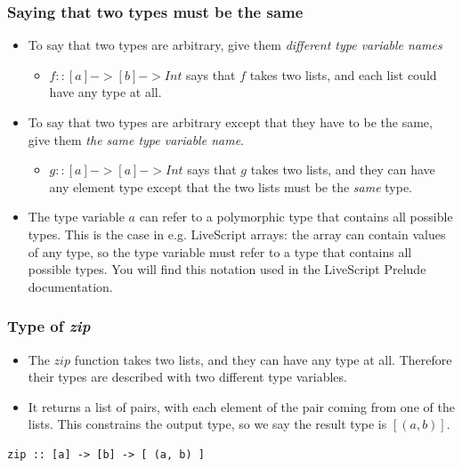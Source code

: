 \documentclass{beamer}
\begin{document}
\begin{frame}[fragile]
\frametitle{Saying that two types must be the same}

\begin{itemize}
\item To say that two types are arbitrary, give them
  \emph{different type variable names}
  \begin{itemize}
  \item $f :: [a] -> [b] -> Int$ says that $f$ takes two lists, and
    each list could have any type at all.
  \end{itemize}
\item To say that two types are arbitrary except that they have to
  be the same, give them \emph{the same type variable name}.
  \begin{itemize}
  \item $g :: [a] -> [a] -> Int$ says that $g$ takes two lists, and
    they can have any element type except that the two lists must
    be the \emph{same} type.
  \end{itemize}
  \item The type variable $a$ can refer to a polymorphic type that contains all possible types. This is the case in e.g. LiveScript arrays: the array can contain values of any type, so the type variable must refer to a type that contains all possible types. You will find this notation used in the LiveScript Prelude documentation.
\end{itemize}

\end{frame}

\begin{frame}[fragile]
\frametitle{Type of \emph{zip}}

\begin{itemize}
\item The $zip$ function takes two lists, and they can have any
  type at all.  Therefore their types are described with two
  different type variables.
\item It returns a list of pairs, with each element of the pair
  coming from one of the lists.  This constrains the output type,
  so we say the result type is $[(a,b)]$.
\end{itemize}

\begin{verbatim}
zip :: [a] -> [b] -> [ (a, b) ]
\end{verbatim}

\end{frame}
\end{document}
